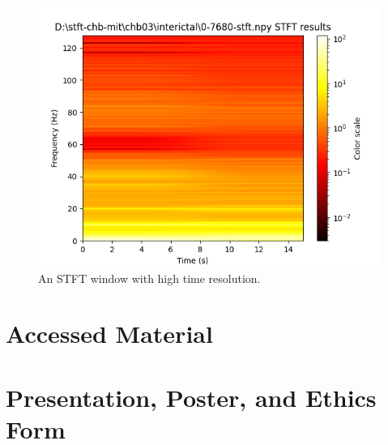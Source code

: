 \documentclass[12pt]{article}
\begin{document}
\begin{figure}[H]
\includegraphics[width=\textwidth]{stft2}
\centering
\caption{An STFT window with high time resolution.}
\label{fig:stft2}
\end{figure}



\section{Accessed Material}



\section{Presentation, Poster, and Ethics Form}



\end{document}
